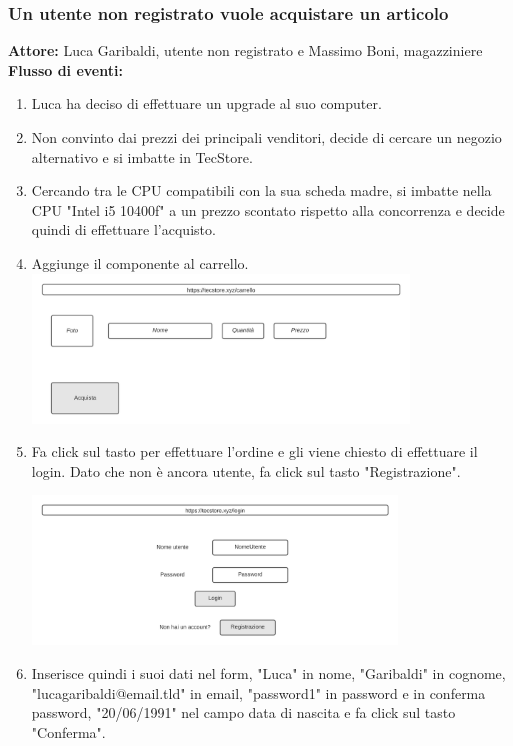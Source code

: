 \documentclass[12pt,a4paper]{article}
\begin{document}
\subsubsection{Un utente non registrato vuole acquistare un articolo}
\textbf{Attore:} Luca Garibaldi, utente non registrato e Massimo Boni, magazziniere \\
\noindent
\textbf{Flusso di eventi:}
\begin{enumerate}
\item Luca ha deciso di effettuare un upgrade al suo computer.

\item Non convinto dai prezzi dei principali venditori, decide di cercare un negozio alternativo e si imbatte in TecStore.

\item Cercando tra le CPU compatibili con la sua scheda madre, si imbatte nella CPU "Intel i5 10400f" a un prezzo scontato rispetto alla concorrenza e decide quindi di effettuare l'acquisto.

\item Aggiunge il componente al carrello. \\

\includegraphics[height=150px]{Mockup/carrello}

\item Fa click sul tasto per effettuare l'ordine e gli viene chiesto di effettuare il login. Dato che non è ancora utente, fa click sul tasto "Registrazione".

\includegraphics[height=150px]{Mockup/login}

\item Inserisce quindi i suoi dati nel form, "Luca" in nome, "Garibaldi" in cognome, "lucagaribaldi@email.tld" in email, "password1" in password e in conferma password, "20/06/1991" nel campo data di nascita e fa click sul tasto "Conferma". \\


\end{enumerate}
\end{document}

